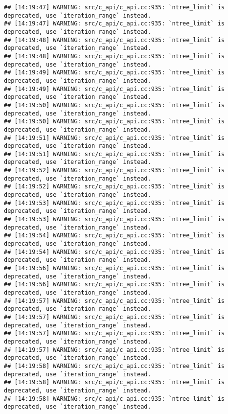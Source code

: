 \documentclass[
]{article}
\begin{document}
\begin{verbatim}
## [14:19:47] WARNING: src/c_api/c_api.cc:935: `ntree_limit` is deprecated, use `iteration_range` instead.
## [14:19:47] WARNING: src/c_api/c_api.cc:935: `ntree_limit` is deprecated, use `iteration_range` instead.
## [14:19:48] WARNING: src/c_api/c_api.cc:935: `ntree_limit` is deprecated, use `iteration_range` instead.
## [14:19:48] WARNING: src/c_api/c_api.cc:935: `ntree_limit` is deprecated, use `iteration_range` instead.
## [14:19:49] WARNING: src/c_api/c_api.cc:935: `ntree_limit` is deprecated, use `iteration_range` instead.
## [14:19:49] WARNING: src/c_api/c_api.cc:935: `ntree_limit` is deprecated, use `iteration_range` instead.
## [14:19:50] WARNING: src/c_api/c_api.cc:935: `ntree_limit` is deprecated, use `iteration_range` instead.
## [14:19:50] WARNING: src/c_api/c_api.cc:935: `ntree_limit` is deprecated, use `iteration_range` instead.
## [14:19:51] WARNING: src/c_api/c_api.cc:935: `ntree_limit` is deprecated, use `iteration_range` instead.
## [14:19:51] WARNING: src/c_api/c_api.cc:935: `ntree_limit` is deprecated, use `iteration_range` instead.
## [14:19:52] WARNING: src/c_api/c_api.cc:935: `ntree_limit` is deprecated, use `iteration_range` instead.
## [14:19:52] WARNING: src/c_api/c_api.cc:935: `ntree_limit` is deprecated, use `iteration_range` instead.
## [14:19:53] WARNING: src/c_api/c_api.cc:935: `ntree_limit` is deprecated, use `iteration_range` instead.
## [14:19:53] WARNING: src/c_api/c_api.cc:935: `ntree_limit` is deprecated, use `iteration_range` instead.
## [14:19:54] WARNING: src/c_api/c_api.cc:935: `ntree_limit` is deprecated, use `iteration_range` instead.
## [14:19:54] WARNING: src/c_api/c_api.cc:935: `ntree_limit` is deprecated, use `iteration_range` instead.
## [14:19:56] WARNING: src/c_api/c_api.cc:935: `ntree_limit` is deprecated, use `iteration_range` instead.
## [14:19:56] WARNING: src/c_api/c_api.cc:935: `ntree_limit` is deprecated, use `iteration_range` instead.
## [14:19:57] WARNING: src/c_api/c_api.cc:935: `ntree_limit` is deprecated, use `iteration_range` instead.
## [14:19:57] WARNING: src/c_api/c_api.cc:935: `ntree_limit` is deprecated, use `iteration_range` instead.
## [14:19:57] WARNING: src/c_api/c_api.cc:935: `ntree_limit` is deprecated, use `iteration_range` instead.
## [14:19:57] WARNING: src/c_api/c_api.cc:935: `ntree_limit` is deprecated, use `iteration_range` instead.
## [14:19:58] WARNING: src/c_api/c_api.cc:935: `ntree_limit` is deprecated, use `iteration_range` instead.
## [14:19:58] WARNING: src/c_api/c_api.cc:935: `ntree_limit` is deprecated, use `iteration_range` instead.
## [14:19:58] WARNING: src/c_api/c_api.cc:935: `ntree_limit` is deprecated, use `iteration_range` instead.

\end{verbatim}
\end{document}
